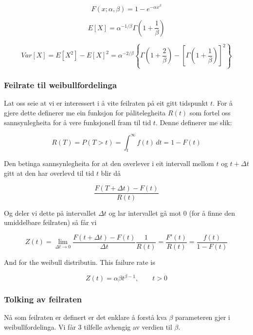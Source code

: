 \begin{equation}
    F(x; \alpha, \beta) = 1 - e^{-\alpha x^\beta}
\end{equation}

\begin{equation}
    E[X] = \alpha^{-1/\beta}\Gamma(1 + \frac{1}{\beta})
\end{equation}

\begin{equation}
    Var[X] = E[X^2] - E[X]^2 = \alpha^{-2/\beta} \left\{ \Gamma\left(1 + \frac{2}{\beta}\right) - 
    \left[ \Gamma \left(1 + \frac{1}{\beta} \right)
    \right]^2\right\}
\end{equation}

\subsubsection{Feilrate til weibullfordelinga}
Lat oss seie at vi er interessert i å vite feilraten på eit gitt tidspunkt $t$. For å gjere dette definerer me ein funksjon for pålitelegheita $R(t)$ som fortel oss sannsynlegheita for å vere funksjonell fram til tid $t$. Denne definerer me slik:

\begin{equation*}
    R(T) = P(T > t) = \int_t^\infty f(t) \,dt = 1 - F(t)
\end{equation*}

Den betinga sannsynlegheita for at den overlever i eit intervall mellom $t$ og $t + \Delta t$ gitt at den har overlevd til tid $t$ blir då

\begin{equation*}
    \frac{F(T + \Delta t) - F(t)}{R(t)}
\end{equation*}

Og deler vi dette på intervallet $\Delta t$ og lar intervallet gå mot 0 (for å finne den umiddelbare feilraten) så får vi

\begin{equation}
    Z(t) = \lim_{\Delta t \rightarrow 0} \frac{F(t + \Delta t) - F(t)}{\Delta t} \frac{1}{R(t)} = \frac{F'(t)}{R(t)} = \frac{f(t)}{1 - F(t)}
\end{equation}

And for the weibull distributin. This failure rate is 

\begin{equation}
    Z(t) = \alpha \beta t^{\beta - 1}, \qquad t > 0
\end{equation}

\subsubsection{Tolking av feilraten}
Nå som feilraten er definert er det enklare å forstå kva $\beta$ parameteren gjer i weibullfordelinga. Vi får 3 tilfelle avhengig av verdien til $\beta$.

